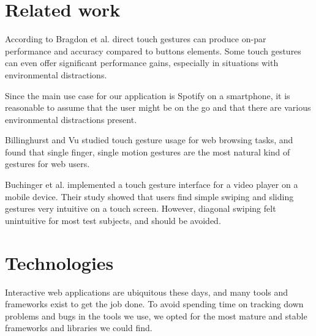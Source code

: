 \documentclass[conference]{IEEEtran}
\begin{document}






\section{Related work}



According to Bragdon et al. direct touch gestures can produce on-par performance and accuracy compared to buttons elements. Some touch gestures can even offer significant performance gains, especially in situations with environmental distractions. \cite{BragdonExperimental}

Since the main use case for our application is Spotify on a smartphone, it is reasonable to assume that the user might be on the go and that there are various environmental distractions present.

Billinghurst and Vu studied touch gesture usage for web browsing tasks, and found that single finger, single motion gestures
are the most natural kind of gestures for web users. \cite{BillinghurstGestures}

Buchinger et al. implemented a touch gesture interface for a video player on a mobile device.
Their study showed that users find simple swiping and sliding gestures very intuitive on a touch screen.
However, diagonal swiping felt unintuitive for most test subjects, and should be avoided. \cite{GestureVideoPlayer}



\section{Technologies}
Interactive web applications are ubiquitous these days, and many tools and frameworks exist to get the job done.
To avoid spending time on tracking down problems and bugs in the tools we use, we opted for the most mature and stable frameworks and libraries we could find.
\end{document}
